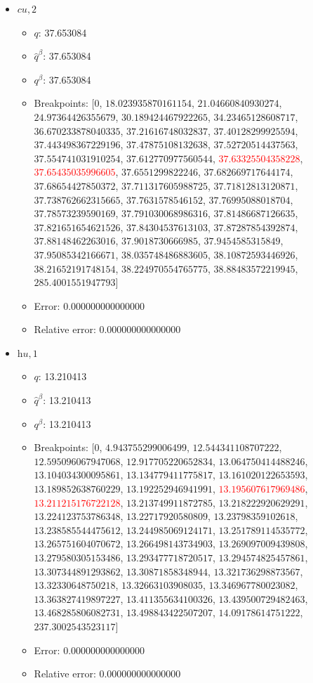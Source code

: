 \documentclass{article}%
\begin{document}
\begin{itemize}
\begin{itemize}
		\item Error: 0.000000000000000%
		\item Relative error: 0.000000000000000%
	\end{itemize}%
	\item $\textit{cu},2$%
	\begin{itemize}%
		\item $q$: 37.653084%
		\item $\hat{q}^\beta$: 37.653084%
		\item $q^\beta$: 37.653084%
		\item Breakpoints: $[$$0$, $18.023935870161154$, $21.04660840930274$, $24.97364426355679$, $30.189424467922265$, $34.23465128608717$, $36.670233878040335$, $37.21616748032837$, $37.40128299925594$, $37.443498367229196$, $37.47875108132638$, $37.52720514437563$, $37.554741031910254$, $37.612770977560544$, \textcolor{red}{$37.63325504358228$}, \textcolor{red}{$37.65435035996605$}, $37.6551299822246$, $37.682669717644174$, $37.68654427850372$, $37.711317605988725$, $37.71812813120871$, $37.738762662315665$, $37.7631578546152$, $37.76995088018704$, $37.78573239590169$, $37.791030068986316$, $37.81486687126635$, $37.821651654621526$, $37.84304537613103$, $37.87287854392874$, $37.88148462263016$, $37.9018730666985$, $37.9454585315849$, $37.95085342166671$, $38.035748486883605$, $38.10872593446926$, $38.21652191748154$, $38.224970554765775$, $38.88483572219945$, $285.4001551947793$$]$%
		\item Error: 0.000000000000000%
		\item Relative error: 0.000000000000000%
	\end{itemize}%
	\item $\textit{hu},1$%
	\begin{itemize}%
		\item $q$: 13.210413%
		\item $\hat{q}^\beta$: 13.210413%
		\item $q^\beta$: 13.210413%
		\item Breakpoints: $[$$0$, $4.943755299006499$, $12.544341108707222$, $12.595096067947068$, $12.917705220652834$, $13.064750414488246$, $13.104034300095861$, $13.134779411775817$, $13.161020122653593$, $13.189852638760229$, $13.192252946941991$, \textcolor{red}{$13.195607617969486$}, \textcolor{red}{$13.211215176722128$}, $13.213749911872785$, $13.218222920629291$, $13.224123753786348$, $13.22717920580809$, $13.23798359102618$, $13.238585544475612$, $13.244985069124171$, $13.251789114535772$, $13.265751604070672$, $13.266498143734903$, $13.269097009439808$, $13.279580305153486$, $13.293477718720517$, $13.294574825457861$, $13.307344891293862$, $13.30871858348944$, $13.321736298873567$, $13.32330648750218$, $13.32663103908035$, $13.346967780023082$, $13.363827419897227$, $13.411355634100326$, $13.439500729482463$, $13.468285806082731$, $13.498843422507207$, $14.09178614751222$, $237.3002543523117$$]$%
		\item Error: 0.000000000000000%
		\item Relative error: 0.000000000000000%
	\end{itemize}%
\end{itemize}%
\end{document}
